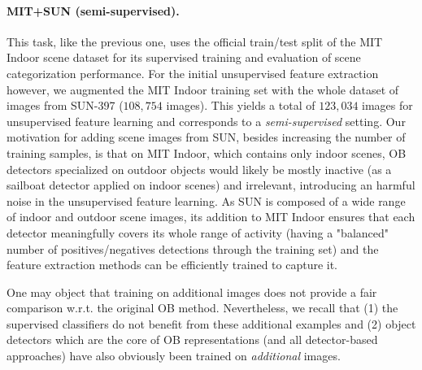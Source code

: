 \documentclass[runningheads,a4paper]{llncs}
\begin{document}
\paragraph{MIT+SUN (semi-supervised).} This task, like the previous one, uses
the official train/test split of the MIT Indoor scene dataset for its
supervised training and evaluation of scene categorization performance. For the
initial unsupervised feature extraction however, we augmented the MIT Indoor
training set with the whole dataset of images from SUN-397 ($108,754$ images).
This yields a total of $123,034$ images for unsupervised feature learning and
corresponds to a \textit{semi-supervised} setting.
%
Our motivation for adding scene images from SUN, besides increasing the number
of training samples, is that on MIT Indoor, which contains only indoor scenes,
OB detectors specialized on outdoor objects would likely be mostly inactive (as
a sailboat detector applied on indoor scenes) and irrelevant, introducing an
harmful noise in the unsupervised feature learning.  As SUN is composed of a
wide range of indoor and outdoor scene images, its addition to MIT Indoor
ensures that each detector meaningfully covers its whole range of activity
(having a "balanced" number of positives/negatives detections through the
training set) and the feature extraction methods can be efficiently trained to
capture it.
%

One may object that training on additional images does not provide a fair
comparison w.r.t. the original OB method. Nevertheless, we recall that (1)
the supervised classifiers do not benefit from these additional examples and
(2) object detectors which are the core of OB representations (and all
detector-based approaches) have also obviously been trained on
\textit{additional} images.
\end{document}
